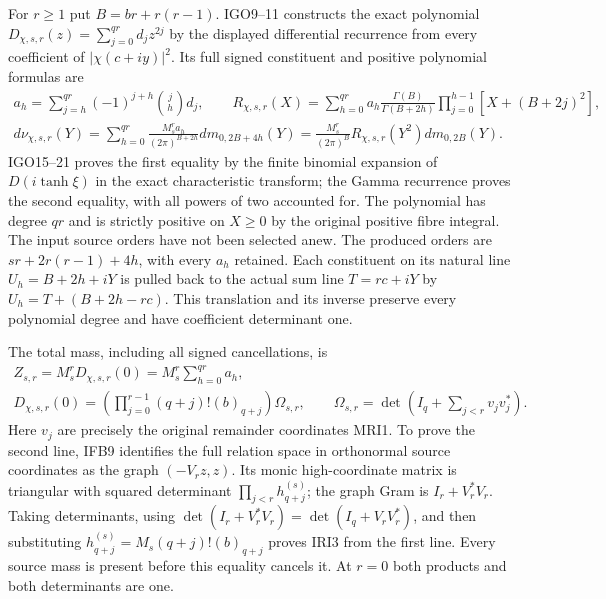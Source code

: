 \documentclass[11pt,a4paper]{article}
\begin{document}
For $r\ge1$ put $B=br+r(r-1)$. IGO9--11 constructs the exact
polynomial $D_{\chi,s,r}(z)=\sum_{j=0}^{qr}d_jz^{2j}$ by the
displayed differential recurrence from every coefficient of
$|\chi(c+iy)|^2$. Its full signed constituent and positive
polynomial formulas are
\[
\begin{gathered}
 a_h=\sum_{j=h}^{qr}(-1)^{j+h}\binom jh d_j,\qquad
 R_{\chi,s,r}(X)=\sum_{h=0}^{qr}a_h
       \frac{\Gamma(B)}{\Gamma(B+2h)}
       \prod_{j=0}^{h-1}[X+(B+2j)^2],\\
 d\nu_{\chi,s,r}(Y)
 =\sum_{h=0}^{qr}\frac{M_s^ra_h}{(2\pi)^{B+2h}}
                             dm_{0,2B+4h}(Y)
 =\frac{M_s^r}{(2\pi)^B}
                  R_{\chi,s,r}(Y^2)dm_{0,2B}(Y).
\end{gathered}\tag{IRI2}
\]
IGO15--21 proves the first equality by the finite binomial expansion
of $D(i\tanh\xi)$ in the exact characteristic transform; the Gamma
recurrence proves the second equality, with all powers of two
accounted for. The polynomial has degree $qr$ and is strictly
positive on $X\ge0$ by the original positive fibre integral.
The input source orders have not been selected anew. The produced
orders are $sr+2r(r-1)+4h$, with every $a_h$ retained. Each
constituent on its natural line $U_h=B+2h+iY$ is pulled back to
the actual sum line $T=rc+iY$ by
$U_h=T+(B+2h-rc)$. This translation and its inverse preserve every
polynomial degree and have coefficient determinant one.

The total mass, including all signed cancellations, is
\[
\begin{gathered}
 Z_{s,r}=M_s^rD_{\chi,s,r}(0)
        =M_s^r\sum_{h=0}^{qr}a_h,\\
 D_{\chi,s,r}(0)
   =\left(\prod_{j=0}^{r-1}(q+j)!(b)_{q+j}\right)\Omega_{s,r},
 \qquad
 \Omega_{s,r}=\det\left(I_q+\sum_{j<r}v_jv_j^*\right).
\end{gathered}\tag{IRI3}
\]
Here $v_j$ are precisely the original remainder coordinates MRI1.
To prove the second line, IFB9 identifies the full relation space
in orthonormal source coordinates as the graph $(-V_rz,z)$.
Its monic high-coordinate matrix is triangular with squared
determinant $\prod_{j<r}h_{q+j}^{(s)}$; the graph Gram is
$I_r+V_r^*V_r$. Taking determinants, using
$\det(I_r+V_r^*V_r)=\det(I_q+V_rV_r^*)$, and then substituting
$h_{q+j}^{(s)}=M_s(q+j)!(b)_{q+j}$ proves IRI3 from the first
line. Every source mass is present before this equality cancels it.
At $r=0$ both products and both determinants are one.
\end{document}
